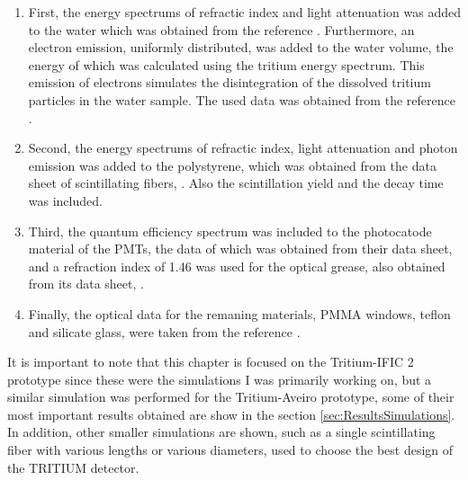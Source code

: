 \begin{enumerate}

\item{} First, the energy spectrums of refractic index and light attenuation was added to the water which was obtained from the reference \cite{WaterPropertiesSimulation}. Furthermore, an electron emission, uniformly distributed, was added to the water volume, the energy of which was calculated using the tritium energy spectrum. This emission of electrons simulates the disintegration of the dissolved tritium particles in the water sample. The used data was obtained from the reference \cite{TritiumEmissionSpectrum}.

\item{} Second, the energy spectrums of refractic index, light attenuation and photon emission was added to the polystyrene, which was obtained from the data sheet of scintillating fibers, \cite{DataSheetBCF12Fiber}.  Also the scintillation yield and the decay time was included. 

\item{} Third, the quantum efficiency spectrum was included to the photocatode material of the PMTs, the data of which was obtained from their data sheet, \cite{DataSheetPMTs} and a refraction index of 1.46 was used for the optical grease, also obtained from its data sheet, \cite{OpticalGrease}.

\item{} Finally, the optical data for the remaning materials, PMMA windows, teflon and silicate glass, were taken from the reference \cite{NEMODataSimulation}.

\end{enumerate} 

It is important to note that this chapter is focused on the Tritium-IFIC 2 prototype since these were the simulations I was primarily working on, but a similar simulation was performed for the Tritium-Aveiro prototype, some of their most important results obtained are show in the section \ref{sec:ResultsSimulations}. In addition, other smaller simulations are shown, such as a single scintillating fiber with various lengths or various diameters, used to choose the best design of the TRITIUM detector.